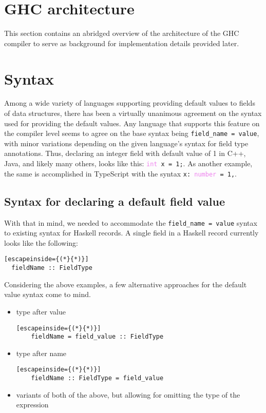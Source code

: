 \documentclass[en]{pracamgr}
\begin{document}
\chapter{GHC architecture}
This section contains an abridged overview of the architecture of the GHC compiler to serve as background for implementation details provided later.


\chapter{Syntax}
Among a wide variety of languages supporting providing default values to fields of data structures, there has been a virtually unanimous agreement on the syntax used for providing the default values.
Any language that supports this feature on the compiler level seems to agree on the base syntax being \texttt{field\_name = value}, with minor variations depending on the given language's syntax for field type annotations.
Thus, declaring an integer field with default value of 1 in C++, Java, and likely many others, looks like this: \texttt{\textcolor{Violet}{int} x = \textcolor{BrickRed}{1};}.
As another example, the same is accomplished in TypeScript with the syntax \texttt{x:\ \textcolor{Violet}{number} = \textcolor{BrickRed}{1},}.

\section{Syntax for declaring a default field value}
With that in mind, we needed to accommodate the \texttt{field\_name = value} syntax to existing syntax for Haskell records.
A single field in a Haskell record currently looks like the following:
\begin{lstlisting}[escapeinside={(*}{*)}]
  fieldName :: FieldType
\end{lstlisting}
Considering the above examples, a few alternative approaches for the default value syntax come to mind.

\begin{itemize}
  \item type after value
  \begin{lstlisting}[escapeinside={(*}{*)}]
    fieldName = field_value :: FieldType
  \end{lstlisting}
  \item type after name
  \begin{lstlisting}[escapeinside={(*}{*)}]
    fieldName :: FieldType = field_value
  \end{lstlisting}
  \item variants of both of the above, but allowing for omitting the type of the expression
\end{itemize}
\end{document}
